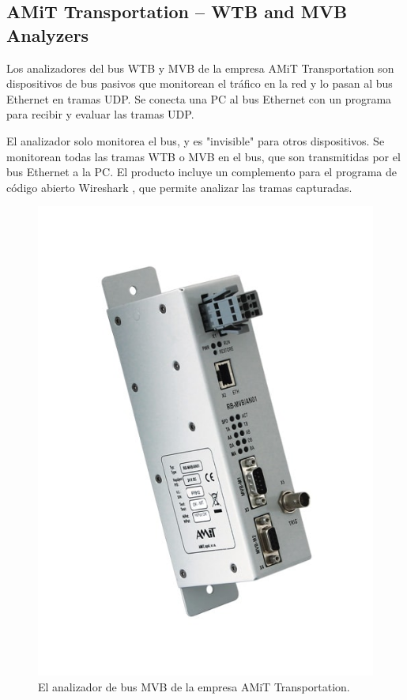 \subsection{AMiT Transportation -- WTB and MVB Analyzers}

Los analizadores del bus WTB y MVB de la empresa AMiT Transportation \cite{amit} son dispositivos de bus pasivos que monitorean el tráfico en la red y lo pasan al bus Ethernet en tramas UDP. Se conecta una PC al bus Ethernet con un programa para recibir y evaluar las tramas UDP.

El analizador solo monitorea el bus, y es "invisible" para otros dispositivos. Se monitorean todas las tramas WTB o MVB en el bus, que son transmitidas por el bus Ethernet a la PC. El producto incluye un complemento para el programa de código abierto Wireshark \cite{wireshark}, que permite analizar las tramas capturadas.

\begin{figure}[htbp]
	\centering
	\includegraphics[height=20\baselineskip]{./Figures/amit.jpg}
	\caption[AMiT Transportation -- WTB and MVB Analyzers]{El analizador de bus MVB de la empresa AMiT Transportation.}
\end{figure}


